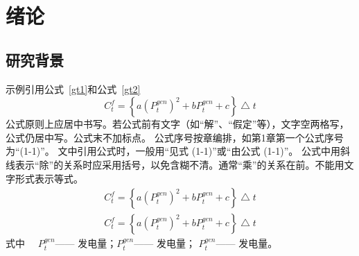 \chapter{绪论}

\section{研究背景}
示例引用公式~\ref{gt1}和公式~\ref{gt2}
\begin{equation}
 C^f_t=\left \{a(P_t^{gen})^2 + b P_t^{gen}+c\right \} \bigtriangleup t
 \label{gt1}
\end{equation}
公式原则上应居中书写。若公式前有文字（如“解”、“假定”等），文字空两格写，公式仍居中写。公式末不加标点。
公式序号按章编排，如第1章第一个公式序号为“(1-1)”。
文中引用公式时，一般用“见式 (1-1)”或“由公式 (1-1)”。
公式中用斜线表示“除”的关系时应采用括号，以免含糊不清。通常“乘”的关系在前。不能用文字形式表示等式。
\begin{gather}
    C^f_t=\left \{a(P_t^{gen})^2 + b P_t^{gen}+c\right \} \bigtriangleup t \label{gt2} \\
    C^f_t=\left \{a(P_t^{gen})^2 + b P_t^{gen}+c\right \} \bigtriangleup t \label{gt3}
\end{gather}
式中~~  $P_t^{gen}$------ 发电量；\breakwithtilde $P_t^{gen}$------ 发电量；
\breakwithtilde $P_t^{gen}$------ 发电量。


